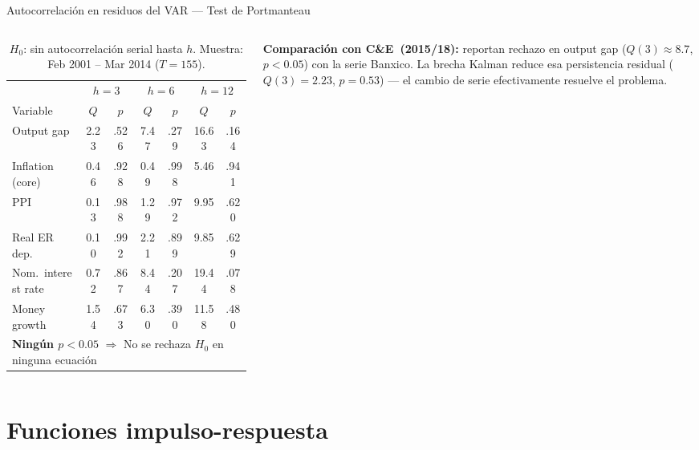 \documentclass[aspectratio=169, 10pt]{beamer}
\newcommand{\CE}{C\&E~(2015/18)}
\begin{document}
\begin{frame}{Autocorrelación en residuos del VAR — Test de Portmanteau}
\begin{columns}[T]
    \begin{table}
      \centering
      {\fontsize{7.5}{9.5}\selectfont
      \begin{tabular}{lcccccc}
        \toprule
        & \multicolumn{2}{c}{$h=3$} & \multicolumn{2}{c}{$h=6$}
        & \multicolumn{2}{c}{$h=12$} \\
        \cmidrule(lr){2-3}\cmidrule(lr){4-5}\cmidrule(lr){6-7}
        Variable & $Q$ & $p$ & $Q$ & $p$ & $Q$ & $p$ \\
        \midrule
        Output gap         & 2.23 & .526 &  7.47 & .279 & 16.63 & .164 \\
        Inflation (core)   & 0.46 & .928 &  0.49 & .998 &  5.46 & .941 \\
        PPI                & 0.13 & .988 &  1.29 & .972 &  9.95 & .620 \\
        Real ER dep.       & 0.10 & .992 &  2.21 & .899 &  9.85 & .629 \\
        Nom.\ interest rate & 0.72 & .867 &  8.44 & .207 & 19.44 & .078 \\
        Money growth       & 1.54 & .673 &  6.30 & .390 & 11.58 & .480 \\
        \midrule
        \multicolumn{7}{l}{\cellcolor{accentgreen!25}%
          \footnotesize\textbf{Ningún $p < 0.05$}
          $\Rightarrow$ No se rechaza $H_0$ en ninguna ecuación} \\
        \bottomrule
      \end{tabular}}
      \caption*{\footnotesize $H_0$: sin autocorrelación serial hasta $h$.
                Muestra: Feb 2001 – Mar 2014 ($T=155$).}
    \end{table}

    \vspace{2pt}
    \footnotesize
    \textbf{Comparación con \CE:} reportan rechazo en output gap
    ($Q(3)\approx 8.7$, $p{<}0.05$) con la serie Banxico.
    La brecha Kalman reduce esa persistencia residual ($Q(3){=}2.23$,
    $p{=}0.53$) — el cambio de serie efectivamente resuelve el problema.

  \end{columns}

\end{frame}

\section{Funciones impulso-respuesta}
\end{document}
